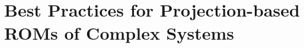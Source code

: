 \chapter{Best Practices for Projection-based ROMs of Complex Systems}
\label{chap:BestPractices}




